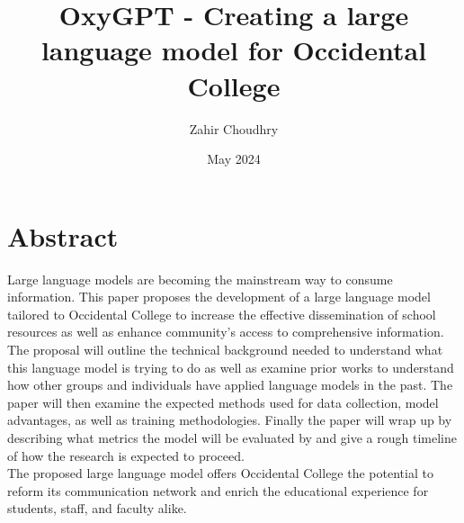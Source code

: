 \documentclass[10pt,twocolumn]{article}
\title{OxyGPT - Creating a large language model for Occidental College}
\author{Zahir Choudhry}
\affiliation{Occidental College}
\date{May 2024}
\begin{document}
\maketitle

\section{Abstract}
Large language models are becoming the mainstream way to consume information. This paper proposes the development of a large language model tailored to Occidental College to increase the effective dissemination of school resources as well as enhance community's access to comprehensive information.\\ \indent The proposal will outline the technical background needed to understand what this language model is trying to do as well as examine prior works to understand how other groups and individuals have applied language models in the past. The paper will then examine the expected methods used for data collection, model advantages, as well as training methodologies. Finally the paper will wrap up by describing what metrics the model will be evaluated by and give a rough timeline of how the research is expected to proceed. \\ \indent The proposed large language model offers Occidental College the potential to reform its communication network and enrich the educational experience for students, staff, and faculty alike.
\end{document}
